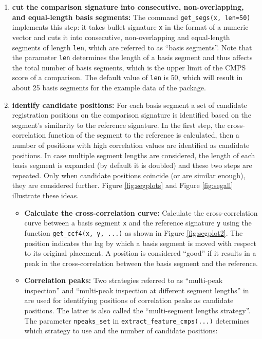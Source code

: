\begin{enumerate}
\def\labelenumi{\arabic{enumi}.}
\item
  \textbf{cut the comparison signature into consecutive,
  non-overlapping, and equal-length basis segments:} The command
  \texttt{get\_segs(x,\ len=50)} implements this step: it takes bullet
  signature \texttt{x} in the format of a numeric vector and cuts it
  into consecutive, non-overlapping and equal-length segments of length
  \texttt{len}, which are referred to as ``basis segments''. Note that
  the parameter \texttt{len} determines the length of a basis segment
  and thus affects the total number of basis segments, which is the
  upper limit of the CMPS score of a comparison. The default value of
  \texttt{len} is 50, which will result in about 25 basis segments for
  the example data of the package.
\item
  \textbf{identify candidate positions:} For each basis segment a set of
  candidate registration positions on the comparison signature is
  identified based on the segment's similarity to the reference
  signature. In the first step, the cross-correlation function of the
  segment to the reference is calculated, then a number of positions
  with high correlation values are identified as candidate positions. In
  case multiple segment lengths are considered, the length of each basis
  segment is expanded (by default it is doubled) and these two steps are
  repeated. Only when candidate positions coincide (or are similar
  enough), they are considered further. Figure \ref{fig:segplots} and
  Figure \ref{fig:segall} illustrate these ideas.

  \begin{itemize}
  \item
    \textbf{Calculate the cross-correlation curve:} Calculate the
    cross-correlation curve between a basis segment \texttt{x} and the
    reference signature \texttt{y} using the function
    \texttt{get\_ccf4(x,\ y,\ ...)} as shown in Figure
    \ref{fig:segplot2}. The position indicates the lag by which a basis
    segment is moved with respect to its original placement. A position
    is considered ``good'' if it results in a peak in the
    cross-correlation between the basis segment and the reference.
  \item
    \textbf{Correlation peaks:} Two strategies referred to as
    ``multi-peak inspection'' and ``multi-peak inspection at different
    segment lengths'' in \citet{cmps} are used for identifying positions
    of correlation peaks as candidate positions. The latter is also
    called the ``multi-segment lengths strategy''. The parameter
    \texttt{npeaks\_set} in \texttt{extract\_feature\_cmps(...)}
    determines which strategy to use and the number of candidate
    positions:


\end{itemize}
\end{enumerate}
